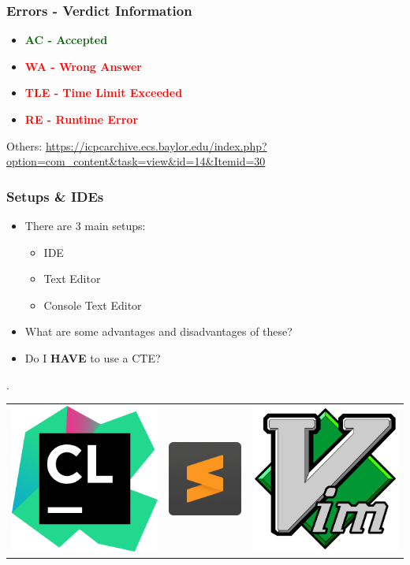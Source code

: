 \documentclass{beamer}
\begin{document}
\begin{frame}
    \frametitle{Errors - Verdict Information}

    \begin{itemize}
        \item \textcolor{darkGreen}{\textbf{AC - Accepted}}
        \item \textcolor{red}{\textbf{WA - Wrong Answer}}
        \item \textcolor{red}{\textbf{TLE - Time Limit Exceeded}}
        \item \textcolor{red}{\textbf{RE - Runtime Error}}
    \end{itemize}

    Others: \url{https://icpcarchive.ecs.baylor.edu/index.php?option=com_content&task=view&id=14&Itemid=30}
\end{frame}

\begin{frame}
    \frametitle{Setups \& IDEs}

    \begin{itemize}
        \item There are 3 main setups:
        \begin{itemize}
            \item IDE
            \item Text Editor
            \item Console Text Editor
        \end{itemize}
        \item What are some advantages and disadvantages of these?
        \item Do I \textbf{HAVE} to use a CTE?
    \end{itemize}

    \vspace{5mm}

    \begin{centering}
        \setlength\tabcolsep{25pt}.
        \begin{tabular}{ c c c }
            \includegraphics[width=0.15\linewidth]{images/clion} &
            \includegraphics[width=0.15\linewidth]{images/sublime} &
            \includegraphics[width=0.15\linewidth]{images/vim}
        \end{tabular}
    \end{centering}

\end{frame}
\end{document}
